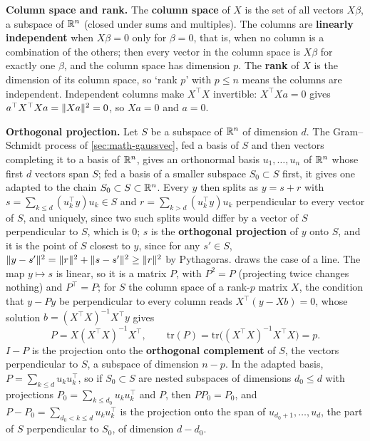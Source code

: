 \textbf{Column space and rank.}
The \textbf{column space} of $X$ is the set of all vectors $X\beta$, a subspace of $\mathbb{R}^n$ (closed under sums and multiples).
The columns are \textbf{linearly independent} when $X\beta = 0$ only for $\beta = 0$, that is, when no column is a combination of the others; then every vector in the column space is $X\beta$ for exactly one $\beta$, and the column space has dimension $p$.
The \textbf{rank} of $X$ is the dimension of its column space, so `rank $p$' with $p \leq n$ means the columns are independent.
Independent columns make $X^\top X$ invertible: $X^\top Xa = 0$ gives $a^\top X^\top Xa = \lVert Xa\rVert^2 = 0$, so $Xa = 0$ and $a = 0$.

\textbf{Orthogonal projection.}
Let $S$ be a subspace of $\mathbb{R}^n$ of dimension $d$. The Gram--Schmidt process of \cref{sec:math-gaussvec}, fed a basis of $S$ and then vectors completing it to a basis of $\mathbb{R}^n$, gives an orthonormal basis $u_1, \ldots, u_n$ of $\mathbb{R}^n$ whose first $d$ vectors span $S$; fed a basis of a smaller subspace $S_0 \subset S$ first, it gives one adapted to the chain $S_0 \subset S \subset \mathbb{R}^n$.
Every $y$ then splits as $y = s + r$ with $s = \sum_{k \leq d}(u_k^\top y)u_k \in S$ and $r = \sum_{k > d}(u_k^\top y)u_k$ perpendicular to every vector of $S$, and uniquely, since two such splits would differ by a vector of $S$ perpendicular to $S$, which is $0$; $s$ is the \textbf{orthogonal projection} of $y$ onto $S$, and it is the point of $S$ closest to $y$, since for any $s' \in S$, $\lVert y - s'\rVert^2 = \lVert r\rVert^2 + \lVert s - s'\rVert^2 \geq \lVert r\rVert^2$ by Pythagoras.
 draws the case of a line.
The map $y \mapsto s$ is linear, so it is a matrix $P$, with $P^2 = P$ (projecting twice changes nothing) and $P^\top = P$; for $S$ the column space of a rank-$p$ matrix $X$, the condition that $y - Py$ be perpendicular to every column reads $X^\top(y - Xb) = 0$, whose solution $b = (X^\top X)^{-1}X^\top y$ gives
\[
P = X(X^\top X)^{-1}X^\top, \qquad \mathrm{tr}(P) = \mathrm{tr}\big((X^\top X)^{-1}X^\top X\big) = p.
\]
$I - P$ is the projection onto the \textbf{orthogonal complement} of $S$, the vectors perpendicular to $S$, a subspace of dimension $n - p$.
In the adapted basis, $P = \sum_{k \leq d}u_ku_k^\top$, so if $S_0 \subset S$ are nested subspaces of dimensions $d_0 \leq d$ with projections $P_0 = \sum_{k \leq d_0}u_ku_k^\top$ and $P$, then $PP_0 = P_0$, and $P - P_0 = \sum_{d_0 < k \leq d}u_ku_k^\top$ is the projection onto the span of $u_{d_0+1}, \ldots, u_d$, the part of $S$ perpendicular to $S_0$, of dimension $d - d_0$.

